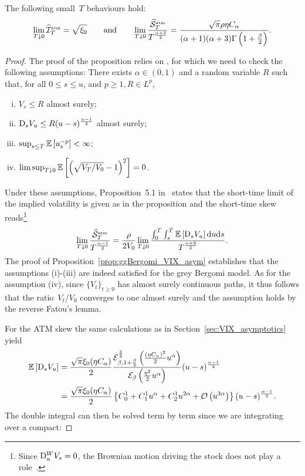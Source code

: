 \begin{proposition}\label{prop:ggBergomi_SPX_asym}
The following small~$T$ behaviours hold:
$$
\lim _{T \downarrow 0} {\widehat{\mathcal{I}}^{\textup{\tiny atm}}}_T = \sqrt{\xi_0}
\qquad\text{and}\qquad
\lim_{T\downarrow 0} \frac{\widehat{\mathcal{S}}^{\textup{\tiny atm}}_T}{T^{\frac{\alpha+3}{2}}} = \frac{\sqrt{\pi}\rho \eta C_\alpha}{(\alpha+1)(\alpha+3)\Gamma\left(1+\frac{\beta}{2}\right)}.
$$
\end{proposition}
\begin{proof}
The proof of the proposition relies on
\cite[Proposition~5.1]{Jacquier2021RoughOptions}, for which we need to check the following assumptions:
    There exists $\alpha \in\left(0, 1\right)$ and a random variable $R$ such that, for all $0 \leq s \leq u$, %
    and $p \geq 1, R \in L^p$,
    \begin{enumerate}[(i)]
        \item $V_s \leq R$ almost surely;
        \item $\mathrm{D}_s V_u \leq R(u-s)^{\frac{\alpha-1}{2}}$ almost surely;
        \item $\sup _{s \leq T} \mathbb{E}\left[u_s^{-p}\right]<\infty$;
        \item $\limsup _{T \downarrow 0} \mathbb{E}\left[\left(\sqrt{V_T / V_0}-1\right)^2\right]=0$.
    \end{enumerate}
Under these assumptions, Proposition~5.1 in~\cite{Jacquier2021RoughOptions} states that the short-time limit of the implied volatility is given as in the proposition and the short-time skew reads\footnote{Since $\mathrm{D}^W_u V_s = 0$, the Brownian motion driving the stock does not play a role~\cite[Section~5]{Jacquier2021RoughOptions}.}
\[
\lim _{T \downarrow 0} \frac{{\widehat{\mathcal{S}}^{\textup{\tiny atm}}}_T}{T^{\frac{\alpha-1}{2}}}
 = \frac{\rho}{2 V_0}
     \lim _{T \downarrow 0} \frac{\int_0^T \int_s^T \mathbb{E}\left[\mathrm{D}_s V_u\right] \mathrm{d} u \mathrm{d} s}{T^{\frac{\alpha+3}2}}.
\]
The proof of Proposition~\ref{prop:ggBergomi_VIX_asym} establishes that the assumptions (i)-(iii) are indeed satisfied for the grey Bergomi model. As for the assumption (iv), since $\{V_t\}_{t\geq 0}$ has almost surely continuous paths, it thus follows that the ratio~$V_t/V_0$ converges to one almost surely and the assumption holds by the reverse Fatou's lemma. 

For the ATM skew the same calculations as in Section~\ref{sec:VIX_asymptotics} yield
\begin{align}
    \mathbb{E}\left[\mathrm{D}_s V_u\right] &= \frac{\sqrt{\pi} \xi_0 (\eta C_\alpha)}{2} \frac{\mathcal{E}_{\beta, 1 + \frac\beta2}^{\frac32} \left(\frac{(\eta C_{\alpha})^2}2 u^\alpha\right)}{\mathcal{E}_{\beta}\left(\frac{\eta^2}2 u^\alpha\right)} (u-s)^{\frac{\alpha-1}{2}} \\
    &= \frac{\sqrt{\pi} \xi_0 (\eta C_\alpha)}{2} \left\{ C_0^1 + C_1^1 u^\alpha + C_2^1 u^{2\alpha} + \mathcal{O}\left(u^{3\alpha}\right)\right\} (u-s)^{\frac{\alpha-1}{2}}.
\end{align}
The double integral can then be solved term by term since we are integrating over a compact:


\end{proof}
